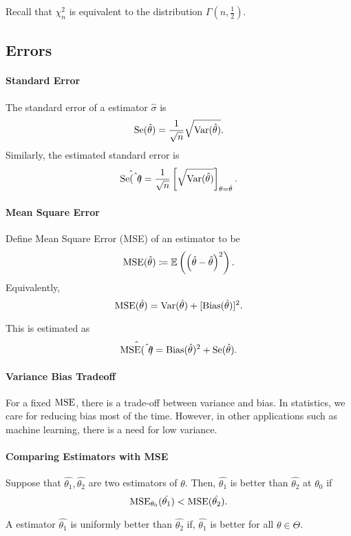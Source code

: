 Recall that \(\chi^2_n\) is equivalent to the distribution \(\Gamma(n, \frac{1}{2})\).

\subsection{Errors}

\paragraph{Standard Error}
The standard error of a estimator \(\hat{\sigma}\) is \[
  \mathrm{Se}(\hat{\theta}) = \frac{1}{\sqrt{n} } \sqrt{\mathrm{Var}(\hat{\theta})}
.\] 
Similarly, the estimated standard error is \[
  \hat{\mathrm{Se}(\hat{\theta})} = \frac{1}{\sqrt{n} }
  \left[ \sqrt{\mathrm{Var}(\hat{\theta})} \right]_{\theta = \hat{\theta}}
.\] 

\paragraph{Mean Square Error}
Define Mean Square Error (MSE) of an estimator to be \[
  \mathrm{MSE}(\hat{\theta}) \coloneqq \mathbb{E}\left( \left( \hat{\theta}  - \hat{\theta}\right)^2 \right) 
.\] 
Equivalently, \[
  \mathrm{MSE}(\hat{\theta}) = \mathrm{Var}(\hat{\theta}) + [\mathrm{Bias}(\hat{\theta})]^2
.\] 

This is estimated as \[
  \hat{\mathrm{MSE}(\hat{\theta})} = \mathrm{Bias}(\hat{\theta})^2 + \mathrm{Se}(\hat{\theta})
.\] 

\paragraph{Variance Bias Tradeoff}
For a fixed \(\mathrm{MSE}\), there is a trade-off between variance and bias.
In statistics, we care for reducing bias most of the time.
However, in other applications such as machine learning, there is a
need for low variance.

\paragraph{Comparing Estimators with MSE}
Suppose that \(\hat{\theta_1}, \hat{\theta_2}\) are two estimators of \(\theta\).
Then, \(\hat{\theta_1}\) is better than \(\hat{\theta_2}\) at \(\theta_0\)
if \[
  \mathrm{MSE}_{\theta_0}(\hat{\theta_1}) < \mathrm{MSE}(\hat{\theta_2})
.\]

A estimator \(\hat{\theta_1}\) is uniformly better than \(\hat{\theta_2}\) if,
\(\hat{\theta_1}\) is better for all  \(\theta \in  \Theta\).

